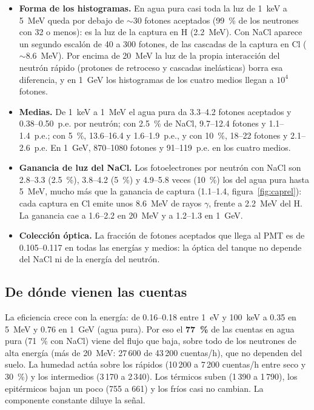 \documentclass[11pt,a4paper]{article}
\newcommand{\tablaancha}[1]{\resizebox{\linewidth}{!}{}}
\begin{document}
\begin{itemize}
\item \textbf{Forma de los histogramas.} En agua pura casi toda la luz de 1~keV a 5~MeV queda por debajo de
$\sim$30 fotones aceptados (99~\% de los neutrones con 32 o menos): es la luz de la captura en H (2.2~MeV). Con NaCl
aparece un segundo escalón de 40 a 300 fotones, de las cascadas de la captura en Cl ($\sim$8.6~MeV). Por encima de
20~MeV la luz de la propia interacción del neutrón rápido (protones de retroceso y cascadas inelásticas) borra esa
diferencia, y en 1~GeV los histogramas de los cuatro medios llegan a $10^4$ fotones.
\item \textbf{Medias.} De 1~keV a 1~MeV el agua pura da 3.3--4.2 fotones aceptados y 0.38--0.50~p.e. por neutrón; con
2.5~\% de NaCl, 9.7--12.4 fotones y 1.1--1.4~p.e.; con 5~\%, 13.6--16.4 y 1.6--1.9~p.e., y con 10~\%, 18--22 fotones y
2.1--2.6~p.e. En 1~GeV, 870--1080 fotones y 91--119~p.e. en los cuatro medios.
\item \textbf{Ganancia de luz del NaCl.} Los fotoelectrones por neutrón con NaCl son 2.8--3.3 (2.5~\%), 3.8--4.2
(5~\%) y 4.9--5.8 veces (10~\%) los del agua pura hasta 5~MeV, mucho más que la ganancia de captura (1.1--1.4,
figura~\ref{fig:caprel}): cada captura en Cl emite unos 8.6~MeV de rayos $\gamma$, frente a 2.2~MeV del H. La ganancia
cae a 1.6--2.2 en 20~MeV y a 1.2--1.3 en 1~GeV.
\item \textbf{Colección óptica.} La fracción de fotones aceptados que llega al PMT es de 0.105--0.117 en todas las
energías y medios: la óptica del tanque no depende del NaCl ni de la energía del neutrón.
\end{itemize}

\subsection{De dónde vienen las cuentas}
\begin{table}[H]
	\centering
\caption{Cuentas por hora del WCD con agua pura ($Q\geq1$) por región de energía del neutrón (tabla~\ref{tab:clasif}),
	y la parte que viene del flujo que baja (igual para todos los suelos).}\label{tab:band}	
	\small
\tablaancha{cuentas_banda}

\end{table}

La eficiencia crece con la energía: de 0.16--0.18 entre 1~eV y 100~keV a 0.35 en 5~MeV y 0.76 en 1~GeV (agua pura).
Por eso el \textbf{77~\%} de las cuentas en agua pura (71~\% con NaCl) viene del flujo que baja, sobre todo de los
neutrones de alta energía (más de 20~MeV: 27\,600 de 43\,200 cuentas/h), que no dependen del suelo. La humedad actúa
sobre los rápidos (10\,200 a 7\,200 cuentas/h entre seco y 30~\%) y los intermedios (3\,170 a 2\,340). Los térmicos
suben (1\,390 a 1\,790), los epitérmicos bajan un poco (755 a 661) y los fríos casi no cambian.
La componente constante diluye la señal.
\end{document}
